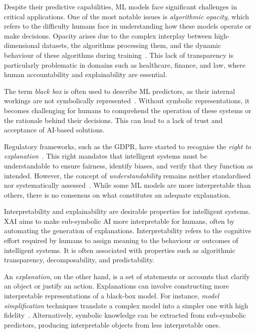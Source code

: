 Despite their predictive capabilities, \gls{ML} models face significant challenges in critical applications.
%
One of the most notable issues is \emph{algorithmic opacity}, which refers to the difficulty humans face in understanding how these models operate or make decisions.
%
Opacity arises due to the complex interplay between high-dimensional datasets, the algorithms processing them, and the dynamic behaviour of these algorithms during training~\cite{DBLP:journals/bigdatasociety/Burrell16}.
%
This lack of transparency is particularly problematic in domains such as healthcare, finance, and law, where human accountability and explainability are essential.


The term \emph{black box} is often used to describe \gls{ML} predictors, as their internal workings are not symbolically represented~\cite{DBLP:journals/cacm/Lipton18}.
%
Without symbolic representations, it becomes challenging for humans to comprehend the operation of these systems or the rationale behind their decisions.
%
This can lead to a lack of trust and acceptance of \gls{AI}-based solutions.


Regulatory frameworks, such as the \gls{GDPR}, have started to recognise the \emph{right to explanation}~\cite{DBLP:journals/aim/GoodmanF17}.
%
This right mandates that intelligent systems must be understandable to ensure fairness, identify biases, and verify that they function as intended.
%
However, the concept of \emph{understandability} remains neither standardised nor systematically assessed~\cite{DBLP:journals/ai/Miller19}.
%
While some \gls{ML} models are more interpretable than others, there is no consensus on what constitutes an adequate explanation.


Interpretability and explainability are desirable properties for intelligent systems.
%
\Gls{XAI} aims to make sub-symbolic \gls{AI} more interpretable for humans, often by automating the generation of explanations.
%
Interpretability refers to the cognitive effort required by humans to assign meaning to the behaviour or outcomes of intelligent systems.
%
It is often associated with properties such as algorithmic transparency, decomposability, and predictability.


An \emph{explanation}, on the other hand, is a set of statements or accounts that clarify an object or justify an action.
%
Explanations can involve constructing more interpretable representations of a black-box model.
%
For instance, \emph{model simplification} techniques translate a complex model into a simpler one with high fidelity~\cite{DBLP:conf/kdd/TolomeiSHL17,DBLP:journals/csur/GuidottiMRTGP19}.
%
Alternatively, symbolic knowledge can be extracted from sub-symbolic predictors, producing interpretable objects from less interpretable ones.


